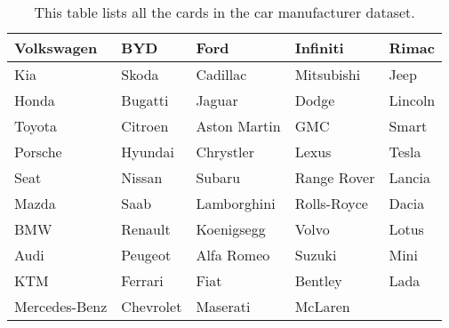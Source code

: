\begin{table}[bp]
\centering
\begin{tabularx}
{\linewidth}{|X|X|X|X|X|}
\hline
Volkswagen    & BYD      & Ford         & Infiniti    & Rimac   \\
\hline
Kia           & Skoda    & Cadillac     & Mitsubishi  & Jeep    \\
\hline
Honda         & Bugatti  & Jaguar       & Dodge       & Lincoln \\
\hline
Toyota        & Citroen  & Aston Martin & GMC         & Smart   \\
\hline
Porsche       & Hyundai  & Chrystler    & Lexus       & Tesla   \\
\hline
Seat          & Nissan   & Subaru       & Range Rover & Lancia  \\
\hline
Mazda         & Saab     & Lamborghini  & Rolls-Royce & Dacia   \\
\hline
BMW           & Renault  & Koenigsegg   & Volvo       & Lotus   \\
\hline
Audi          & Peugeot  & Alfa Romeo   & Suzuki      & Mini    \\
\hline
KTM           & Ferrari  & Fiat         & Bentley     & Lada    \\
\hline
Mercedes-Benz & Chevrolet& Maserati     & McLaren     &        \\
\hline
\end{tabularx} 
\caption[Car Dataset] 
{ 
This table lists all the cards in the car manufacturer dataset.
}
\label{tab:dataset-car}
\end{table}